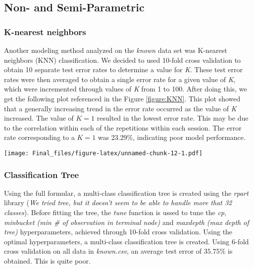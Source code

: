 \documentclass[]{article}
\let\origfigure\figure
\let\endorigfigure\endfigure
\renewenvironment{figure}[1][2] {
    \expandafter\origfigure\expandafter[H]
} {
    \endorigfigure
}
\begin{document}
\subsection{Non- and Semi-Parametric}\label{non--and-semi-parametric}

\subsubsection{K-nearest neighbors}\label{k-nearest-neighbors}

Another modeling method analyzed on the \emph{known} data set was
K-nearest neighbors (KNN) classification. We decided to used 10-fold
cross validation to obtain 10 separate test error rates to determine a
value for \emph{K}. These test error rates were then averaged to obtain
a single error rate for a given value of \emph{K}, which were
incremented through values of \emph{K} from 1 to 100. After doing this,
we get the following plot referenced in the Figure \ref{figure:KNN}.
This plot showed that a generally increasing trend in the error rate
occurred as the value of \emph{K} increased. The value of \(K=1\)
resulted in the lowest error rate. This may be due to the correlation
within each of the repetitions within each session. The error rate
corresponding to a \(K=1\) was 23.29\%, indicating poor model
performance.

\begin{figure}
\centering
\texttt{[image: Final\_files/figure-latex/unnamed-chunk-12-1.pdf]}
\caption{Mean 10-fold CV error rates for different K in KNN classifier.
\label{figure:KNN}}
\end{figure}

\subsubsection{Classification Tree}\label{classification-tree}

Using the full formular, a multi-class classification tree is created
using the \emph{rpart} library (\emph{We tried tree, but it doesn't seem
to be able to handle more that 32 classes}). Before fitting the tree,
the \emph{tune} function is ussed to tune the \emph{cp}, \emph{minbucket
(min \# of observation in terminal node)} and \emph{maxdepth (max depth
of tree)} hyperparameters, achieved through 10-fold cross validation.
Using the optimal hyperparameters, a multi-class classification tree is
created. Using 6-fold cross validation on all data in \emph{known.csv},
an average test error of \(35.75\%\) is obtained. This is quite poor.
\end{document}

